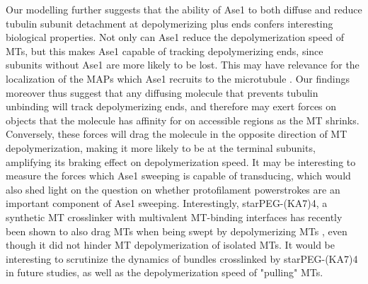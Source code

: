 Our modelling further suggests that the ability of Ase1 to both diffuse and reduce tubulin subunit detachment at depolymerizing plus ends confers interesting biological properties. Not only can Ase1 reduce the depolymerization speed of MTs, but this makes Ase1 capable of tracking depolymerizing ends, since subunits without Ase1 are more likely to be lost. This may have relevance for the localization of the MAPs which Ase1 recruits to the microtubule . Our findings moreover thus suggest that any diffusing molecule that prevents tubulin unbinding will track depolymerizing ends, and therefore may exert forces on objects that the molecule has affinity for on accessible regions as the MT shrinks. Conversely, these forces will drag the molecule in the opposite direction of MT depolymerization, making it more likely to be at the terminal subunits, amplifying its braking effect on depolymerization speed. It may be interesting to measure the forces which Ase1 sweeping is capable of transducing, which would also shed light on the question on whether protofilament powerstrokes are an important component of Ase1 sweeping. Interestingly, starPEG-(KA7)4, a synthetic MT crosslinker with multivalent MT-binding interfaces has recently been shown to also drag MTs when being swept by depolymerizing MTs \parencite{Drechsler2019}, even though it did not hinder MT depolymerization of isolated MTs. It would be interesting to scrutinize the dynamics of bundles crosslinked by starPEG-(KA7)4 in future studies, as well as the depolymerization speed of "pulling" MTs. \par

